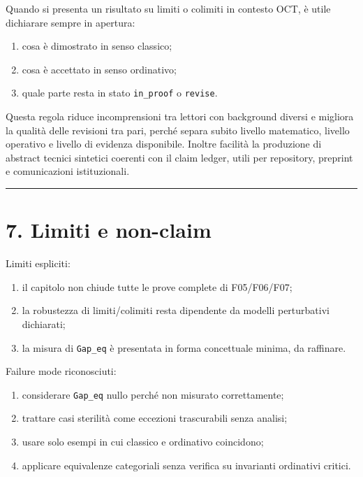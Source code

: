 Quando si presenta un risultato su limiti o colimiti in contesto OCT, è utile dichiarare sempre in apertura:

\begin{enumerate}
\def\labelenumi{\arabic{enumi}.}
\tightlist
\item
  cosa è dimostrato in senso classico;
\item
  cosa è accettato in senso ordinativo;
\item
  quale parte resta in stato \texttt{in\_proof} o \texttt{revise}.
\end{enumerate}

Questa regola riduce incomprensioni tra lettori con background diversi e migliora la qualità delle revisioni tra pari, perché separa subito livello matematico, livello operativo e livello di evidenza disponibile.
Inoltre facilità la produzione di abstract tecnici sintetici coerenti con il claim ledger, utili per repository, preprint e comunicazioni istituzionali.

\begin{center}\rule{0.5\linewidth}{0.5pt}\end{center}

\section{7. Limiti e non-claim}

Limiti espliciti:

\begin{enumerate}
\def\labelenumi{\arabic{enumi}.}
\tightlist
\item
  il capitolo non chiude tutte le prove complete di F05/F06/F07;
\item
  la robustezza di limiti/colimiti resta dipendente da modelli perturbativi dichiarati;
\item
  la misura di \texttt{Gap\_eq} è presentata in forma concettuale minima, da raffinare.
\end{enumerate}

Failure mode riconosciuti:

\begin{enumerate}
\def\labelenumi{\arabic{enumi}.}
\tightlist
\item
  considerare \texttt{Gap\_eq} nullo perché non misurato correttamente;
\item
  trattare casi sterilità come eccezioni trascurabili senza analisi;
\item
  usare solo esempi in cui classico e ordinativo coincidono;
\item
  applicare equivalenze categoriali senza verifica su invarianti ordinativi critici.
\end{enumerate}

